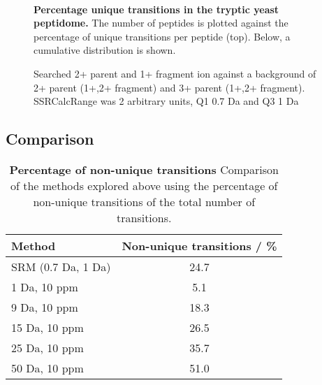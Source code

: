 \begin{figure}

\center
{} \\

\caption{ \textbf{Percentage unique transitions in the tryptic yeast peptidome.}
The number of peptides is plotted against the percentage of unique transitions
per peptide (top). Below, a cumulative distribution is shown.
}
\label{fig:400range.07Da_1Da}
\end{figure}
\begin{figure}

\center
{}

\caption{
Searched 2+ parent and 1+ fragment ion against a background of 2+ parent (1+,2+ fragment) and 3+ parent (1+,2+ fragment).
SSRCalcRange was 2 arbitrary units, Q1 0.7 Da and Q3 1 Da
}
\label{fig:400range.07Da_1Da_q3dist}
\end{figure}


\subsection{Comparison}




\begin{table}[h]

\centering
\caption[]
{\textbf{Percentage of non-unique transitions}
Comparison of the methods explored above using the percentage of non-unique
transitions of the total number of transitions.
}
\label{tab:comp_nonunique}

\begin{tabular}{ l  c }
\maketablespace
Method &Non-unique transitions / \%  \\
\toprule
SRM (0.7 Da, 1 Da) & 24.7 \\
\midrule
1 Da, 10 ppm&  \phantom{1}5.1 \\
9 Da, 10 ppm&  18.3\\
15 Da, 10 ppm& 26.5\\
25 Da, 10 ppm& 35.7\\
50 Da, 10 ppm& 51.0\\

\end{tabular}
\end{table}


